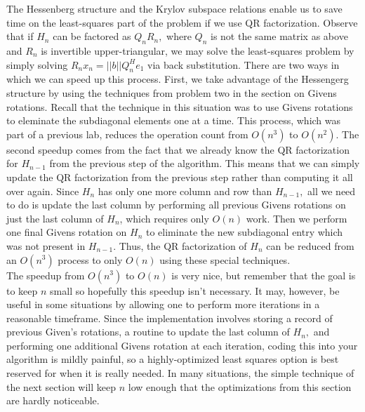 The Hessenberg structure and the Krylov subspace relations enable us to save time on the least-squares part of the problem if we use QR factorization.
Observe that if $H_n$ can be factored as $Q_nR_n,$ where $Q_n$ is not the same matrix as above and $R_n$ is invertible upper-triangular, we may solve the least-squares problem by simply solving $R_nx_n=||b||Q_n^He_1$ via back substitution.
There are two ways in which we can speed up this process.
First, we take advantage of the Hessengerg structure by using the techniques from problem two in the section on Givens rotations.
Recall that the technique in this situation was to use Givens rotations to eleminate the subdiagonal elements one at a time.
This process, which was part of a previous lab, reduces the operation count from $O(n^3)$ to $O(n^2)$.
The second speedup comes from the fact that we already know the QR factorization for $H_{n-1}$ from the previous step of the algorithm.
This means that we can simply update the QR factorization from the previous step rather than computing it all over again.
Since $H_{n}$ has only one more column and row than $H_{n-1},$ all we need to do is update the last column by performing all previous Givens rotations on just the last column of $H_n$, which requires only $O(n)$ work.
Then we perform one final Givens rotation on $H_n$ to eliminate the new subdiagonal entry which was not present in $H_{n-1}.$
Thus, the QR factorization of $H_n$ can be reduced from an $O(n^3)$ process to only $O(n)$ using these special techniques.\\
\indent The speedup from $O(n^3)$ to $O(n)$ is very nice, but remember that the goal is to keep $n$ small so hopefully this speedup isn't necessary.
It may, however, be useful in some situations by allowing one to perform more iterations in a reasonable timeframe.
Since the implementation involves storing a record of previous Given's rotations, a routine to update the last column of $H_n,$ and performing one additional Givens rotation at each iteration, coding this into your algorithm is mildly painful, so a highly-optimized least squares option is best reserved for when it is really needed.
In many situations, the simple technique of the next section will keep $n$ low enough that the optimizations from this section are hardly noticeable.
%

